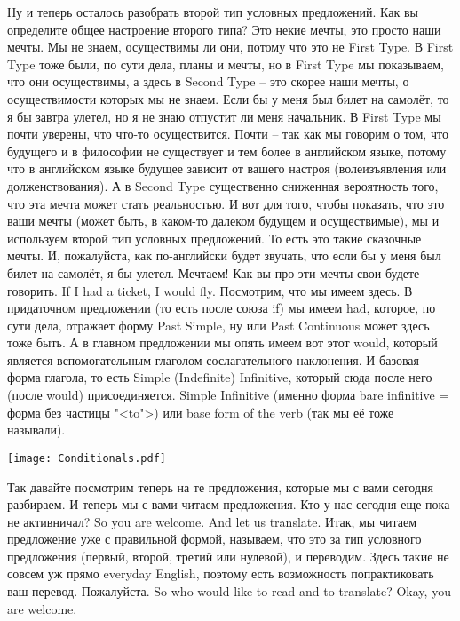 \documentclass[main.tex]{subfiles}
\begin{document}
Ну и теперь осталось разобрать второй тип условных предложений.
Как вы определите общее настроение второго типа?
Это некие мечты, это просто наши мечты.
Мы не знаем, осуществимы ли они, потому что это не First Type.
В First Type тоже были, по сути дела, планы и мечты, но в First Type мы показываем, что они осуществимы, а здесь в Second Type -- это скорее наши мечты, о осуществимости которых мы не знаем.
Если бы у меня был билет на самолёт, то я бы завтра улетел, но я не знаю отпустит ли меня начальник.
В First Type мы почти уверены, что что-то осуществится.
Почти -- так как мы говорим о том, что будущего и в философии не существует и тем более в английском языке, потому что в английском языке будущее зависит от вашего настроя (волеизъявления или долженствования).
А в Second Type существенно сниженная вероятность того, что эта мечта может стать реальностью.
И вот для того, чтобы показать, что это ваши мечты (может быть, в каком-то далеком будущем и осуществимые), мы и используем второй тип условных предложений.
То есть это такие сказочные мечты.
И, пожалуйста, как по-английски будет звучать, что если бы у меня был билет на самолёт, я бы улетел.
Мечтаем!
Как вы про эти мечты свои будете говорить.
If I had a ticket, I would fly.
Посмотрим, что мы имеем здесь.
В придаточном предложении (то есть после союза if) мы имеем had, которое, по сути дела, отражает форму Past Simple, ну или Past Continuous может здесь тоже быть.
А в главном предложении мы опять имеем вот этот would, который является вспомогательным глаголом сослагательного наклонения.
И базовая форма глагола, то есть Simple (Indefinite) Infinitive, который сюда после него (после would) присоединяется.
Simple Infinitive (именно форма bare infinitive = форма без частицы "<to">) или base form of the verb (так мы её тоже называли).

{\parindent0pt\texttt{[image: Conditionals.pdf]}}

\newpage
{}

Так давайте посмотрим теперь на те предложения, которые мы с вами сегодня разбираем.
И теперь мы с вами читаем предложения.
Кто у нас сегодня еще пока не активничал?
So you are welcome.
And let us translate.
Итак, мы читаем предложение уже с правильной формой, называем, что это за тип условного предложения (первый, второй, третий или нулевой), и переводим.
Здесь такие не совсем уж прямо everyday English, поэтому есть возможность попрактиковать ваш перевод.
Пожалуйста.
So who would like to read and to translate?
Okay, you are welcome.
\end{document}
